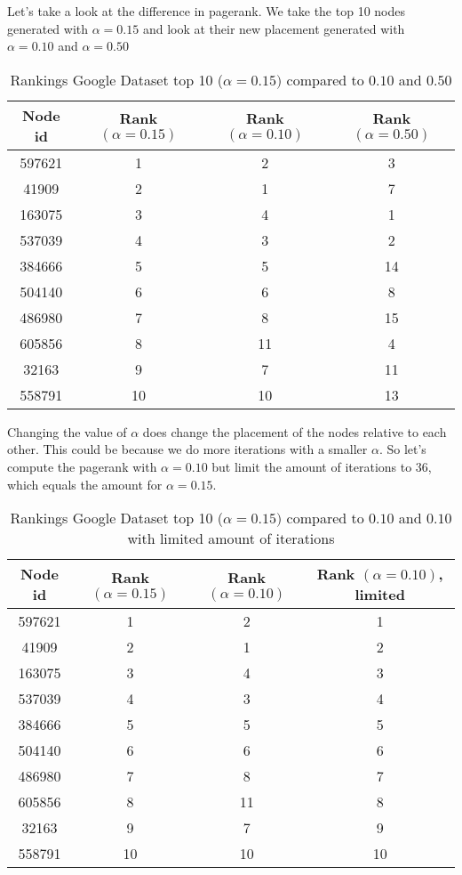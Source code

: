 \documentclass{article}
\begin{document}
Let's take a look at the difference in pagerank. We take the top 10 nodes generated with $\alpha = 0.15$ and look at their new placement generated with $\alpha = 0.10$ and $\alpha = 0.50$ 
\begin{table}[H]
    \centering
    \begin{tabular}{ | c | c | c | c |}
        \hline
        \textbf{Node id} & Rank $(\alpha = 0.15)$ & Rank $(\alpha = 0.10)$ & Rank $(\alpha = 0.50)$ \\ \hline
        597621  & 1  & 2  & 3 \\ \hline
        41909   & 2  & 1  & 7 \\ \hline
        163075  & 3  & 4  & 1\\ \hline
        537039  & 4  & 3  & 2 \\ \hline
        384666  & 5  & 5  & 14 \\ \hline
        504140  & 6  & 6  & 8 \\ \hline
        486980  & 7  & 8  & 15 \\ \hline
        605856  & 8  & 11 & 4\\ \hline
        32163   & 9  & 7  & 11\\ \hline
        558791  & 10 & 10 & 13  \\ \hline
    \end{tabular}
    \caption{Rankings Google Dataset top 10 ($\alpha = 0.15)$ compared to $0.10$ and $0.50$}
    \label{tab:my_label}
\end{table}
Changing the value of $\alpha$ does change the placement of the nodes relative to each other. This could be because we do more iterations with a smaller $\alpha$. So let's compute the pagerank with $\alpha = 0.10$ but limit the amount of iterations to 36, which equals the amount for $\alpha = 0.15$.
\begin{table}[H]
    \centering
    \begin{tabular}{ | c | c | c | c |}
        \hline
        \textbf{Node id} & Rank $(\alpha = 0.15)$ & Rank $(\alpha = 0.10)$ & Rank $(\alpha = 0.10)$, limited \\ \hline
        597621  & 1  & 2  & 1 \\ \hline
        41909   & 2  & 1  & 2 \\ \hline
        163075  & 3  & 4  & 3\\ \hline
        537039  & 4  & 3  & 4 \\ \hline
        384666  & 5  & 5  & 5 \\ \hline
        504140  & 6  & 6  & 6 \\ \hline
        486980  & 7  & 8  & 7 \\ \hline
        605856  & 8  & 11 & 8\\ \hline
        32163   & 9  & 7  & 9\\ \hline
        558791  & 10 & 10 & 10  \\ \hline
    \end{tabular}
    \caption{Rankings Google Dataset top 10 ($\alpha = 0.15)$ compared to $0.10$ and $0.10$ with limited amount of iterations}
    \label{tab:my_label}
\end{table}
\end{document}
